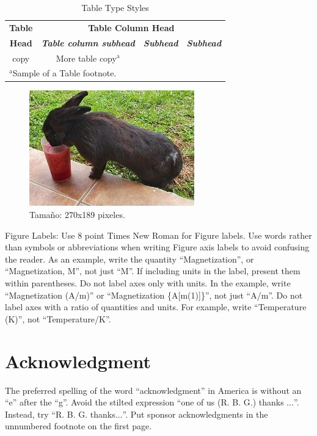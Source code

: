 \documentclass[conference]{IEEEtran}
\begin{document}
	\begin{table}[htbp]
		\caption{Table Type Styles}
		\begin{center}
			\begin{tabular}{|c|c|c|c|}
				\hline
				\textbf{Table}&\multicolumn{3}{|c|}{\textbf{Table Column Head}} \\
				\cline{2-4} 
				\textbf{Head} & \textbf{\textit{Table column subhead}}& \textbf{\textit{Subhead}}& \textbf{\textit{Subhead}} \\
				\hline
				copy& More table copy$^{\mathrm{a}}$& &  \\
				\hline
				\multicolumn{4}{l}{$^{\mathrm{a}}$Sample of a Table footnote.}
			\end{tabular}
			\label{tab1}
		\end{center}
	\end{table}
	
	\begin{figure}[htbp]
		\centerline{\includegraphics{imagesLatex/rabbitTest.jpg}}
		\caption{Tamaño: 270x189 pixeles.}
		\label{fig}
	\end{figure}
	
	Figure Labels: Use 8 point Times New Roman for Figure labels. Use words 
	rather than symbols or abbreviations when writing Figure axis labels to 
	avoid confusing the reader. As an example, write the quantity 
	``Magnetization'', or ``Magnetization, M'', not just ``M''. If including 
	units in the label, present them within parentheses. Do not label axes only 
	with units. In the example, write ``Magnetization (A/m)'' or ``Magnetization 
	\{A[m(1)]\}'', not just ``A/m''. Do not label axes with a ratio of 
	quantities and units. For example, write ``Temperature (K)'', not 
	``Temperature/K''.
	
	\section*{Acknowledgment}
	
	The preferred spelling of the word ``acknowledgment'' in America is without 
	an ``e'' after the ``g''. Avoid the stilted expression ``one of us (R. B. 
	G.) thanks $\ldots$''. Instead, try ``R. B. G. thanks$\ldots$''. Put sponsor 
	acknowledgments in the unnumbered footnote on the first page.
	
\end{document}
